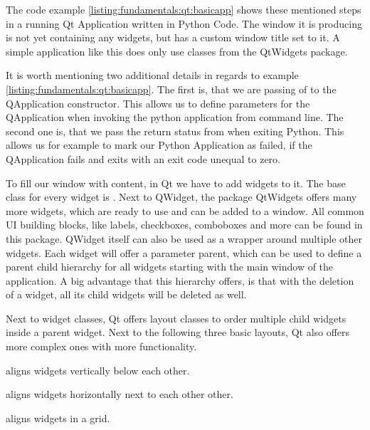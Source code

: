 The code example \ref{listing:fundamentals:qt:basicapp} shows these mentioned steps in a running Qt Application written in Python Code. The window it is producing is not yet containing any widgets, but has a custom window title set to it. A simple application like this does only use classes from the QtWidgets package.



It is worth mentioning two additional details in regards to example \ref{listing:fundamentals:qt:basicapp}. The first is, that we are passing of  to the QApplication constructor. This allows us to define parameters for the QApplication when invoking the python application from command line. The second one is, that we pass the return status from  when exiting Python. This allows us for example to mark our Python Application as failed, if the QApplication fails and exits with an exit code unequal to zero.

To fill our window with content, in Qt we have to add widgets to it. The base class for every widget is . Next to QWidget, the package QtWidgets offers many more widgets, which are ready to use and can be added to a window. All common UI building blocks, like labels, checkboxes, comboboxes and more can be found in this package. QWidget itself can also be used as a wrapper around multiple other widgets. Each widget will offer a parameter parent, which can be used to define a parent child hierarchy for all widgets starting with the main window of the application. A big advantage that this hierarchy offers, is that with the deletion of a widget, all its child widgets will be deleted as well.

Next to widget classes, Qt offers layout classes to order multiple child widgets inside a parent widget. Next to the following three basic layouts, Qt also offers more complex ones with more functionality.

\begin{description}
    \item {} aligns widgets vertically below each other.
    \item {} aligns widgets horizontally next to each other other.
    \item {} aligns widgets in a grid.
\end{description}

